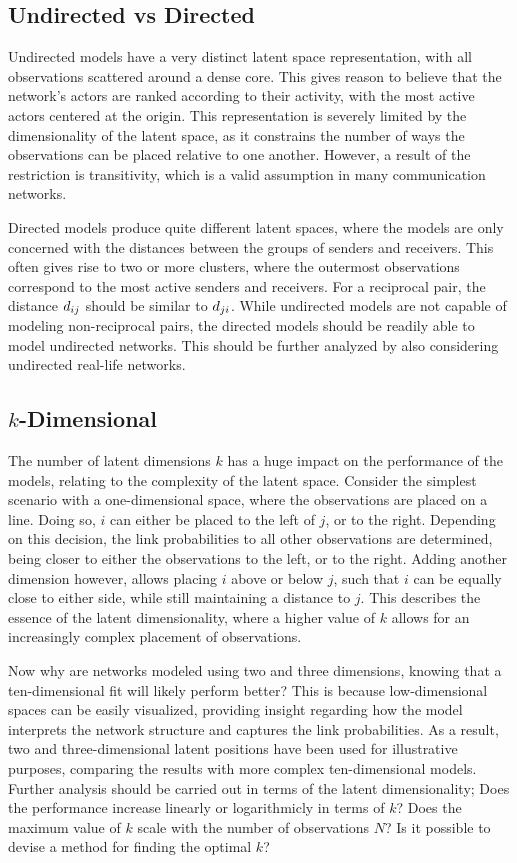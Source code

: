 \subsection{Undirected vs Directed}

    Undirected models have a very distinct latent space representation, with all observations scattered around a dense core. This gives reason to believe that the network's actors are ranked according to their activity, with the most active actors centered at the origin. 
    This representation is severely limited by the dimensionality of the latent space, as it constrains the number of ways the observations can be placed relative to one another. However, a result of the restriction is transitivity, which is a valid assumption in many communication networks.
    
    Directed models produce quite different latent spaces, where the models are only concerned with the distances between the groups of senders and receivers. This often gives rise to two or more clusters, where the outermost observations correspond to the most active senders and receivers. For a reciprocal pair, the distance $\sub(d)$ should be similar to $\sub(d)(ji)$. While undirected models are not capable of modeling non-reciprocal pairs, the directed models should be readily able to model undirected networks. This should be further analyzed by also considering undirected real-life networks.

\subsection{\texorpdfstring{$k$}{k}-Dimensional}

    The number of latent dimensions $k$ has a huge impact on the performance of the models, relating to the complexity of the latent space. Consider the simplest scenario with a one-dimensional space, where the observations are placed on a line. Doing so, $i$ can either be placed to the left of $j$, or to the right. Depending on this decision, the link probabilities to all other observations are determined, being closer to either the observations to the left, or to the right. Adding another dimension however, allows placing $i$ above or below $j$, such that $i$ can be equally close to either side, while still maintaining a distance to $j$. This describes the essence of the latent dimensionality, where a higher value of $k$ allows for an increasingly complex placement of observations.
    
    Now why are networks modeled using two and three dimensions, knowing that a ten-dimensional fit will likely perform better? This is because low-dimensional spaces can be easily visualized, providing insight regarding how the model interprets the network structure and captures the link probabilities.
    As a result, two and three-dimensional latent positions have been used for illustrative purposes, comparing the results with more complex ten-dimensional models. Further analysis should be carried out in terms of the latent dimensionality; Does the performance increase linearly or logarithmicly in terms of $k$? Does the maximum value of $k$ scale with the number of observations $N$? Is it possible to devise a method for finding the optimal $k$?

